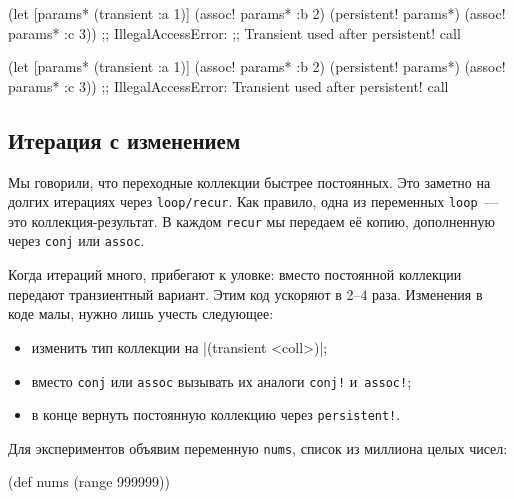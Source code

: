 \begin{english}
  \begin{clojure}
(let [params* (transient {:a 1})]
  (assoc! params* :b 2)
  (persistent! params*)
  (assoc! params* :c 3))
;; IllegalAccessError:
;; Transient used after persistent! call
  \end{clojure}
\end{english}

\else

\begin{english}
  \begin{clojure}
(let [params* (transient {:a 1})]
  (assoc! params* :b 2)
  (persistent! params*)
  (assoc! params* :c 3))
;; IllegalAccessError: Transient used after persistent! call
  \end{clojure}
\end{english}

\fi

\subsection{Итерация с изменением}


Мы говорили, что переходные коллекции быстрее постоянных. Это заметно на долгих
итерациях через \verb|loop/recur|. Как правило, одна из переменных
\verb|loop|~--- это коллекция-результат. В каждом \verb|recur| мы передаем её
копию, дополненную через \verb|conj| или \verb|assoc|.

Когда итераций много, прибегают к уловке: вместо постоянной коллекции передают
транзиентный вариант. Этим код ускоряют в 2--4 раза. Изменения в коде малы,
нужно лишь учесть следующее:

\begin{itemize}

\item
  изменить тип коллекции на \spverb|(transient <coll>)|;

\item
  вместо \verb|conj| или \verb|assoc| вызывать их аналоги \verb|conj!|
  и~\verb|assoc!|;

\item
  в конце вернуть постоянную коллекцию через \verb|persistent!|.

\end{itemize}

Для экспериментов объявим переменную \verb|nums|, список из миллиона целых
чисел:

\begin{english}
  \begin{clojure}
(def nums (range 999999))
  \end{clojure}
\end{english}

